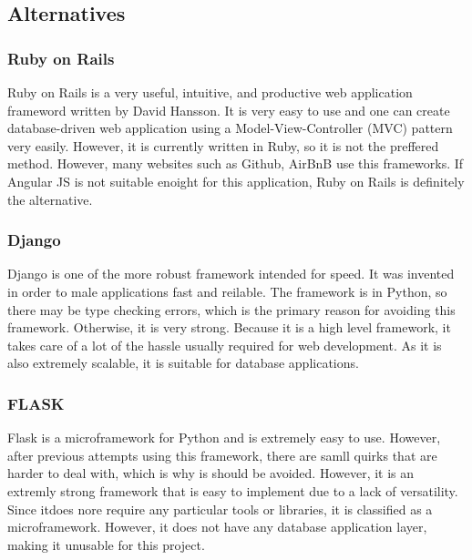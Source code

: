 \documentclass{article}
\begin{document}
    \subsection{Alternatives}\label{sec:Tech:intent}

    \subsubsection{Ruby on Rails}
      Ruby on Rails is a very useful, intuitive, and productive web application frameword written by David Hansson.  It is very easy to use and one can create database-driven web application using a Model-View-Controller (MVC) pattern very easily.  However, it is currently written in Ruby, so it is not the preffered method.  However, many websites such as Github, AirBnB use this frameworks.  If Angular JS is not suitable enoight for this application, Ruby on Rails is definitely the alternative.

    \subsubsection{Django}
      Django is one of the more robust framework intended for speed.  It was invented in order to male applications fast and reilable.  The framework is in Python, so there may be type checking errors, which is the primary reason for avoiding this framework.  Otherwise, it is very strong.  Because it is a high level framework, it takes care of a lot of the hassle usually required for web development.  As it is also extremely scalable, it is suitable for database applications.

    \subsubsection{FLASK}
      Flask is a microframework for Python and is extremely easy to use.  However, after previous attempts using this framework, there are samll quirks that are harder to deal with, which is why is should be avoided.  However, it is an extremly strong framework that is easy to implement due to a lack of versatility.  Since itdoes nore require any particular tools or libraries, it is classified as a microframework.  However, it does not have any database application layer, making it unusable for this project.

    \newpage

\end{document}
